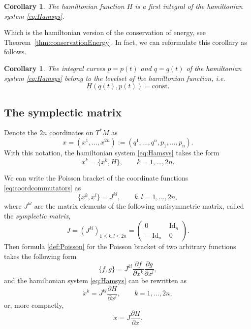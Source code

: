\documentclass[english,fontsize=11pt,paper=b5]{scrbook}
\DeclareMathOperator{\Id}{Id}
\DeclareMathOperator{\Id}{Id}
\newtheorem{corollary}[theorem]{Corollary}
\theoremstyle{definition}
\begin{document}
    \begin{corollary}
      The hamiltonian function $H$ is a first integral of the hamiltonian system \eqref{eq:Hamsys}.
    \end{corollary}
    Which is the hamiltonian version of the conservation of energy, see Theorem~\ref{thm:conservationEnergy}.
    In fact, we can reformulate this corollary as follows.
    \begin{corollary}
      The integral curves $p = p(t)$ and $q=q(t)$ of the hamiltonian system \eqref{eq:Hamsys} belong to the levelset of the hamiltonian function, i.e.
      \begin{equation}
        H(q(t), p(t)) = \mathrm{const}.
      \end{equation}
    \end{corollary}

    \subsection{The symplectic matrix}\label{sec:symplmat}
    Denote the $2n$ coordinates on $T^*M$ as
    \begin{equation}
      x=(x^1, \ldots, x^{2n}) := (q^1, \ldots, q^n, p_1, \ldots, p_n).
    \end{equation}
    With this notation, the hamiltonian system \eqref{eq:Hamsys} takes the form
    \begin{equation}
      \dot x^k = \big\{x^k, H\big\}, \qquad k=1,\ldots,2n.
    \end{equation}

    We can write the Poisson bracket of the coordinate functions \eqref{eq:coordcommutators} as
    \begin{equation}
      \big\{x^k, x^l\big\} = J^{kl}, \qquad k,l = 1,\ldots,2n,
    \end{equation}
    where $J^{kl}$ are the matrix elements of the following antisymmetric matrix, called the \emph{symplectic matrix},
    \begin{equation}\label{eq:symmat}
      J = \left(J^{kl}\right)_{1\leq k,l\leq2n} = \begin{pmatrix}0 & \Id_n \\ -\Id_n & 0\end{pmatrix}.
    \end{equation}
    Then formula \eqref{def:Poisson} for the Poisson bracket of two arbitrary functions takes the following form
    \begin{equation}\label{eq:coordPB}
      \big\{f,g\big\} = J^{kl} \frac{\partial f}{\partial x^k}\frac{\partial g}{\partial x^l},
    \end{equation}
    and the hamiltonian system \eqref{eq:Hamsys} can be rewritten as
    \begin{equation}
      \dot x^k = J^{kl} \frac{\partial H}{\partial x^l}, \qquad k=1,\ldots,2n,
    \end{equation}
    or, more compactly,
    \begin{equation}\label{eq:hamsysJ}
      \dot x = J \frac{\partial H}{\partial x}.
    \end{equation}
\end{document}
